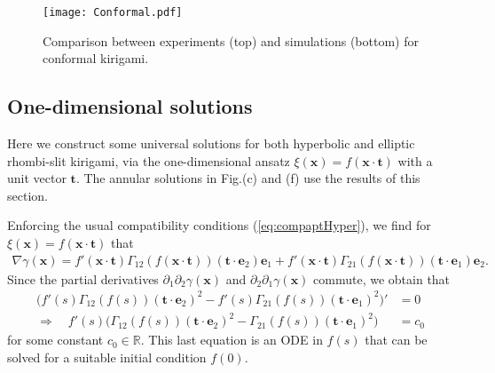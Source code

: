 \documentclass[aps,11pt,tightenlines,notitlepage,superscriptaddress,longbibliography,nofootinbib]{revtex4-1}
\begin{document}
\begin{figure}[h!]
\centering
\texttt{[image: Conformal.pdf]}
\caption{Comparison between experiments (top) and simulations (bottom) for conformal kirigami.}
\label{fig:Conformal}
\end{figure}


\subsection{One-dimensional solutions}
Here we construct some universal solutions for both hyperbolic and elliptic rhombi-slit kirigami, via the one-dimensional ansatz $\xi(\mathbf{x}) = f(\mathbf{x} \cdot \mathbf{t})$ with a unit vector $\mathbf{t}$. The annular solutions in Fig.(c) and (f) use the results of this section.

Enforcing the usual compatibility conditions (\ref{eq:compaptHyper}), we find for $\xi(\mathbf{x}) = f(\mathbf{x} \cdot \mathbf{t})$ that \begin{equation}
\begin{aligned}
\nabla \gamma(\mathbf{x}) = f'(\mathbf{x} \cdot \mathbf{t}) \Gamma_{12}(f(\mathbf{x} \cdot \mathbf{t})) (\mathbf{t} \cdot \mathbf{e}_2) \mathbf{e}_1 +  f'(\mathbf{x} \cdot \mathbf{t}) \Gamma_{21}(f(\mathbf{x} \cdot \mathbf{t})) (\mathbf{t} \cdot \mathbf{e}_1) \mathbf{e}_2.
\end{aligned}
\end{equation}
Since the partial derivatives $\partial_1 \partial_2 \gamma(\mathbf{x})$ and $\partial_2 \partial_1 \gamma(\mathbf{x})$ commute, we obtain that
\begin{equation}
\begin{aligned}\label{eq:ODEformula}
\Big( f'(s) \Gamma_{12}(f(s)) (\mathbf{t} \cdot \mathbf{e}_2)^2  - f'(s) \Gamma_{21}(f(s))  (\mathbf{t} \cdot \mathbf{e}_1)^2 \Big)' &= 0 \\
\Rightarrow \quad f'(s)\Big(  \Gamma_{12}(f(s)) (\mathbf{t} \cdot \mathbf{e}_2)^2 - \Gamma_{21}(f(s))  (\mathbf{t} \cdot \mathbf{e}_1)^2\Big) &= c_0
\end{aligned}
\end{equation}
for some constant $c_0 \in \mathbb{R}$. This last equation is an ODE in $f(s)$ that can be solved for a suitable initial condition $f(0)$. 
\end{document}
